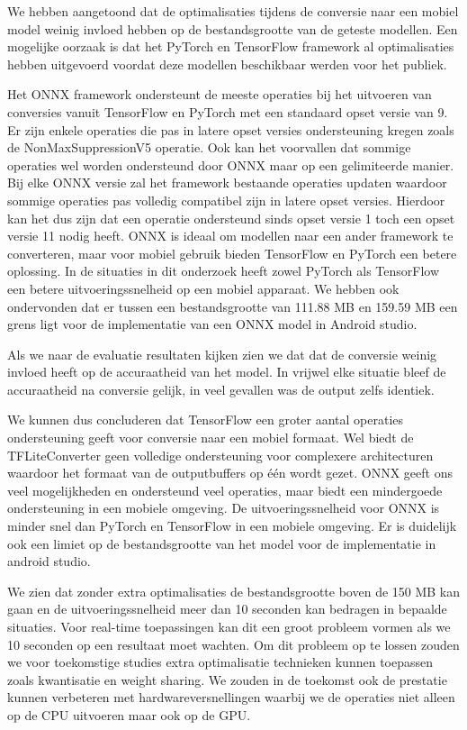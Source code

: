 We hebben aangetoond dat de optimalisaties tijdens de conversie naar een mobiel model weinig invloed hebben op de bestandsgrootte van de geteste modellen.
Een mogelijke oorzaak is dat het PyTorch en TensorFlow framework al optimalisaties hebben uitgevoerd voordat deze modellen beschikbaar werden voor het publiek.

Het ONNX framework ondersteunt de meeste operaties bij het uitvoeren van conversies vanuit TensorFlow en PyTorch met een standaard opset versie van 9.
Er zijn enkele operaties die pas in latere opset versies ondersteuning kregen zoals de NonMaxSuppressionV5 operatie.
Ook kan het voorvallen dat sommige operaties wel worden ondersteund door ONNX maar op een gelimiteerde manier.
Bij elke ONNX versie zal het framework bestaande operaties updaten waardoor sommige operaties pas volledig compatibel zijn in latere opset versies.
Hierdoor kan het dus zijn dat een operatie ondersteund sinds opset versie 1 toch een opset versie 11 nodig heeft.
ONNX is ideaal om modellen naar een ander framework te converteren, maar voor mobiel gebruik bieden TensorFlow en PyTorch een betere oplossing.
In de situaties in dit onderzoek heeft zowel PyTorch als TensorFlow een betere uitvoeringssnelheid op een mobiel apparaat.
We hebben ook ondervonden dat er tussen een bestandsgrootte van 111.88 MB en 159.59 MB een grens ligt voor de implementatie van een ONNX model in Android studio.

Als we naar de evaluatie resultaten kijken zien we dat dat de conversie weinig invloed heeft op de accuraatheid van het model.
In vrijwel elke situatie bleef de accuraatheid na conversie gelijk, in veel gevallen was de output zelfs identiek.

We kunnen dus concluderen dat TensorFlow een groter aantal operaties ondersteuning geeft voor conversie naar een mobiel formaat.
Wel biedt de TFLiteConverter geen volledige ondersteuning voor complexere architecturen waardoor het formaat van de outputbuffers op \'e\'en wordt gezet.
ONNX geeft ons veel mogelijkheden en ondersteund veel operaties, maar biedt een mindergoede ondersteuning in een mobiele omgeving.
De uitvoeringssnelheid voor ONNX is minder snel dan PyTorch en TensorFlow in een mobiele omgeving.
Er is duidelijk ook een limiet op de bestandsgrootte van het model voor de implementatie in android studio.

We zien dat zonder extra optimalisaties de bestandsgrootte boven de 150 MB kan gaan en de uitvoeringssnelheid meer dan 10 seconden kan bedragen in bepaalde situaties.
Voor real-time toepassingen kan dit een groot probleem vormen als we 10 seconden op een resultaat moet wachten.
Om dit probleem op te lossen zouden we voor toekomstige studies extra optimalisatie technieken kunnen toepassen zoals kwantisatie en weight sharing.
We zouden in de toekomst ook de prestatie kunnen verbeteren met hardwareversnellingen waarbij we de operaties niet alleen op de CPU uitvoeren maar ook op de GPU. 